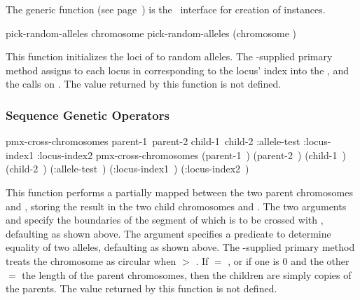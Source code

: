 {{

The generic function  (see
page~\pageref{method:make-chromosome}) is the \geco\ interface for creation
of  instances.
\par}%

\gap

\filbreak
{\samepage



\Defgeneric pick-random-alleles {chromosome}
 pick-random-alleles {(chromosome )}

This function initializes the loci of  to random alleles. The
\geco-supplied primary method assigns  to each locus in
 corresponding to the locus' index into the , and the
calls  on .
The value returned by this function is not defined.
\par}%

\filbreak


{\samepage
\subsubsection{Sequence Genetic Operators}

\Defgeneric pmx-cross-chromosomes {\hbox{parent-1 parent-2}
                               \hbox{child-1 child-2}
                               \key :allele-test :locus-index1 :locus-index2}
 pmx-cross-chromosomes {\hbox{(parent-1 )}
                              \hbox{(parent-2 )}
                              \hbox{(child-1 )}
                              \hbox{(child-2 )}
    \key \hbox{(:allele-test )}
         \hbox{(:locus-index1 )}
         \hbox{(:locus-index2 )}}

This function performs a partially mapped 
\cite{ga:goldberg} between the two parent chromosomes  and
, storing the result in the two child chromosomes  and
. The two arguments  and  specify
the boundaries of the segment of  which is to be crossed with
, defaulting as shown above. The  argument specifies
a predicate to determine equality of two alleles, defaulting as shown above. The
\geco-supplied primary method treats the chromosome as circular when
 $>$ . If  $=$
, or if one is 0 and the other $=$ the length of the
parent chromosomes, then the children are simply copies of the parents.
The value returned by this function is not defined.
\par}%

}
